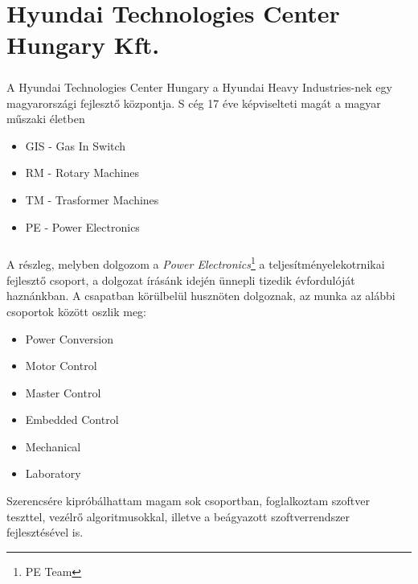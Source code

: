 \chapter*{Hyundai Technologies Center Hungary Kft.}

\paragraph{}
A Hyundai Technologies Center Hungary a Hyundai Heavy Industries-nek egy magyarországi fejlesztő központja. S cég 17 éve képviselteti magát a magyar műszaki életben


\begin{itemize}
	\item{GIS - Gas In Switch}
	\item{RM - Rotary Machines}
	\item{TM - Trasformer Machines}
	\item{PE - Power Electronics}
\end{itemize}



\paragraph{}
A részleg, melyben dolgozom a \emph{Power Electronics}\footnote{PE Team} a teljesítményelekotrnikai fejlesztő csoport, a dolgozat írásánk idején ünnepli tizedik évfordulóját haznánkban. A csapatban körülbelül husznöten dolgoznak, az munka az alábbi csoportok között oszlik meg:

\begin{itemize}
	\item{Power Conversion}
	\item{Motor Control}
	\item{Master Control}
	\item{Embedded Control}
	\item{Mechanical}
	\item{Laboratory} 
\end{itemize}

Szerencsére kipróbálhattam magam sok csoportban, foglalkoztam szoftver teszttel, vezélrő algoritmusokkal, illetve a beágyazott szoftverrendszer fejlesztésével is. 



